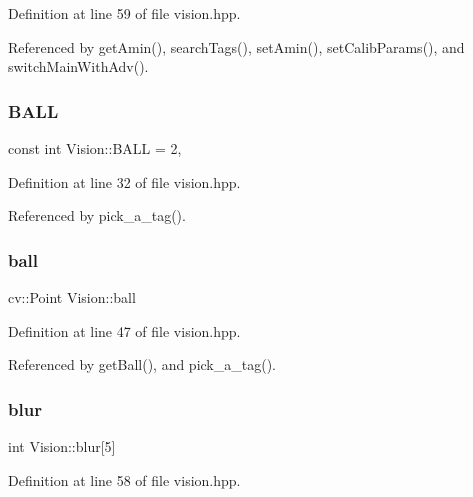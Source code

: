 Definition at line 59 of file vision.\+hpp.



Referenced by get\+Amin(), search\+Tags(), set\+Amin(), set\+Calib\+Params(), and switch\+Main\+With\+Adv().

\mbox{\label{class_vision_a08a1f319b2c20419f420bf9c280c4861}} 
\subsubsection{\texorpdfstring{B\+A\+LL}{BALL}}
{\footnotesize\ttfamily const int Vision\+::\+B\+A\+LL = 2\hspace{0.3cm}{\ttfamily [static]}, {\ttfamily [private]}}



Definition at line 32 of file vision.\+hpp.



Referenced by pick\+\_\+a\+\_\+tag().

\mbox{\label{class_vision_a525356abf07741955e63faffff9740af}} 
\subsubsection{\texorpdfstring{ball}{ball}}
{\footnotesize\ttfamily cv\+::\+Point Vision\+::ball\hspace{0.3cm}{\ttfamily [private]}}



Definition at line 47 of file vision.\+hpp.



Referenced by get\+Ball(), and pick\+\_\+a\+\_\+tag().

\mbox{\label{class_vision_a48d1a64140429848f9a75a9d46c6e920}} 
\subsubsection{\texorpdfstring{blur}{blur}}
{\footnotesize\ttfamily int Vision\+::blur\mbox{[}5\mbox{]}\hspace{0.3cm}{\ttfamily [private]}}



Definition at line 58 of file vision.\+hpp.



